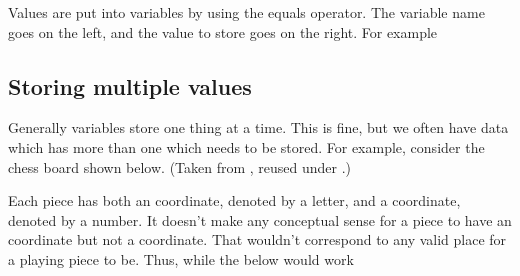 \documentclass[letterpaper,10pt,british]{sphinxmanual}
\let\sphinxpxdimen\pdfpxdimen\else\newdimen\sphinxpxdimen
\begin{document}
\sphinxAtStartPar
Values are put into variables by using the equals  operator. The variable name goes on the left, and the value to store goes on the right. For example

\begin{sphinxVerbatim}[commandchars=\\\{\}]
  
  
  
  
  
\end{sphinxVerbatim}


\subsection{Storing multiple values}
\label{\detokenize{chapters/programming_fundamentals/variables:storing-multiple-values}}
\sphinxAtStartPar
Generally variables store one thing at a time. This is fine, but we often have data which has more than one  which needs to be stored. For example, consider the chess board shown below. (Taken from , re\sphinxhyphen{}used under .)

\begin{figure}[htbp]
\centering

\noindent\sphinxincludegraphics[width=400\sphinxpxdimen]{{chess_board.svg}.png}
\end{figure}

\sphinxAtStartPar
Each piece has both an  coordinate, denoted by a letter, and a  coordinate, denoted by a number. It doesn’t make any conceptual sense for a piece to have an  coordinate but not a  coordinate. That wouldn’t correspond to any valid place for a playing piece to be. Thus, while the below would work

\begin{sphinxVerbatim}[commandchars=\\\{\}]
  
  
\end{sphinxVerbatim}
\end{document}
